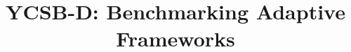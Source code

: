 \documentclass[conference]{IEEEtran}
\begin{document}

\title{YCSB-D: Benchmarking Adaptive Frameworks}%



%
%
%
%
\end{document}
